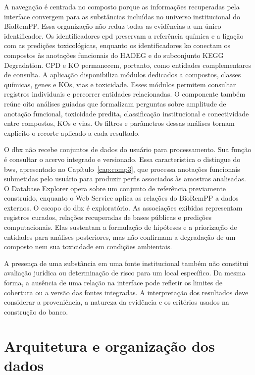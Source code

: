A navegação é centrada no composto porque as informações recuperadas pela
interface convergem para as substâncias incluídas no universo institucional do
BioRemPP. Essa organização não reduz todas as evidências a um único
identificador. Os identificadores \gls{cpd} preservam a referência química e
a ligação com as predições toxicológicas, enquanto os identificadores
\gls{ko} conectam os compostos às anotações funcionais do HADEG e do
subconjunto KEGG Degradation. CPD e KO permanecem, portanto, como entidades
complementares de consulta. A aplicação disponibiliza módulos dedicados a compostos, classes químicas,
genes e KOs, vias e toxicidade. Esses módulos permitem consultar registros
individuais e percorrer entidades relacionadas. O componente também reúne
oito análises guiadas que formalizam perguntas sobre amplitude de anotação
funcional, toxicidade predita, classificação institucional e conectividade
entre compostos, KOs e vias. Os filtros e parâmetros dessas análises tornam
explícito o recorte aplicado a cada resultado.

O \gls{dbx} não recebe conjuntos de dados do usuário para processamento. Sua
função é consultar o acervo integrado e versionado. Essa característica o
distingue do \gls{bws}, apresentado no Capítulo~\ref{cap:comp3}, que processa
anotações funcionais submetidas pelo usuário para produzir perfis associados
às amostras analisadas. O Database Explorer opera sobre um conjunto de
referência previamente construído, enquanto o Web Service aplica as relações
do BioRemPP a dados externos. O escopo do \gls{dbx} é exploratório. As associações exibidas representam
registros curados, relações recuperadas de bases públicas e predições
computacionais. Elas sustentam a formulação de hipóteses e a priorização de
entidades para análises posteriores, mas não confirmam a degradação de um
composto nem sua toxicidade em condições ambientais.

A presença de uma substância em uma fonte institucional também não constitui
avaliação jurídica ou determinação de risco para um local específico. Da
mesma forma, a ausência de uma relação na interface pode refletir os limites
de cobertura ou a versão das fontes integradas. A interpretação dos resultados
deve considerar a proveniência, a natureza da evidência e os critérios usados
na construção do banco.

\section{Arquitetura e organização dos dados}
\label{sec:c2-arquitetura}

